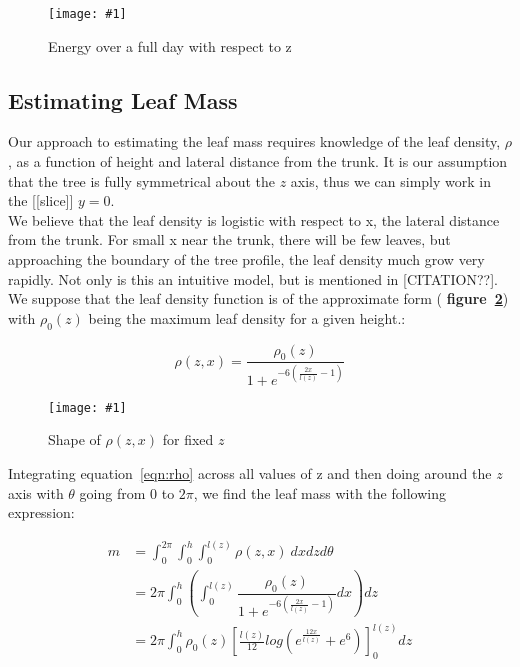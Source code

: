 \documentclass[10pt,twocolumn]{article}
\newlength{\imgwidth}
\newcommand\scalegraphics[1]{%
    \settowidth{\imgwidth}{\texttt{[image: \#1]}}%
    \setlength{\imgwidth}{\minof{\imgwidth}{\columnwidth}}%
    \texttt{[image: \#1]}%
}
\begin{document}
\begin{figure}[h!]
  \centering
  \scalegraphics{img/energy.png}
  \caption{Energy over a full day with respect to z}
  \label{fig:energy}
\end{figure}

\subsection{Estimating Leaf Mass}
Our approach to estimating the leaf mass requires knowledge of the
leaf density, $\rho$, as a function of height and lateral distance
from the trunk. It is our assumption that the tree is fully
symmetrical about the $z$ axis, thus we can simply work in the
[[slice]] $y=0$. \\

We believe that the leaf density is logistic with respect to x, the
lateral distance from the trunk. For small x near the trunk, there
will be few leaves, but approaching the boundary of the tree profile,
the leaf density much grow very rapidly. Not only is this an intuitive
model, but is mentioned in [CITATION??]. We suppose that the leaf
density function is of the approximate form ({\bf
  figure~\ref{fig:rho}}) with $\rho_0(z)$ being the maximum leaf
density for a given height.:

\begin{center}
  \begin{equation}
    \rho(z,x) = \dfrac{\rho_0(z)}{1+e^{-6(\frac{2x}{l(z)}-1)}} \label{eqn:rho}
  \end{equation}
\end{center}

\begin{figure}[h!]
  \centering
  \scalegraphics{img/rho.png}
  \caption{Shape of $\rho(z,x)$ for fixed $z$}
  \label{fig:rho}
\end{figure}

Integrating equation~\eqref{eqn:rho} across all values of z and then
doing around the $z$ axis with $\theta$ going from 0 to $2\pi$, we
find the leaf mass with the following expression:

\begin{center}
  \begin{equation}
    \begin{split}
      m &= \int_0^{2\pi} \int_0^{h} \int_0^{l(z)} \rho(z,x) \ dx dz d\theta \\
      &= 2\pi \int_0^{h} \left(\int_0^{l(z)} \dfrac{\rho_0(z)}{1+e^{-6(\frac{2x}{l(z)}-1)}} dx\right) dz \\
      &= 2\pi \int_0^{h} \rho_0(z) \left[ \frac{l(z)}{12} log\left( e^{\frac{12x}{l(z)}} + e^6 \right) \right]_0^{l(z)} dz
    \end{split}
  \end{equation}
\end{center}
\end{document}
